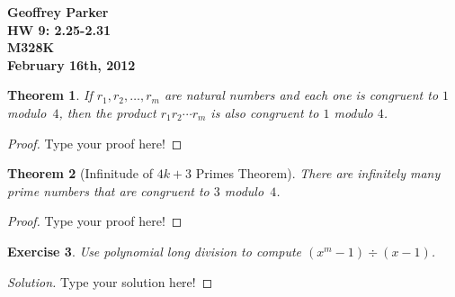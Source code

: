 \documentclass[12pt,leqno]{article}
\numberwithin{equation}{section}
\newtheorem{thm}{Theorem}[section]
\newtheorem{exer}[thm]{Exercise}
\theoremstyle{definition}
\begin{document}
\thispagestyle{plain}
\begin{flushright}
\large{\textbf{Geoffrey Parker \\
HW 9: 2.25-2.31\\
M328K \\
February 16th, 2012 \\}}
\end{flushright}

\markboth{}{} \setcounter{section}{0} \baselineskip=18pt

\setcounter{tocdepth}{4}



\setcounter{section}{2}

\setcounter{thm}{36}


\begin{thm}
If $r_1, r_2, \hdots, r_m$ are natural numbers and each one is
congruent to $1$ modulo~$4$, then the product $r_1r_2 \cdots r_m$ is
also congruent to $1$ modulo $4$.
\end{thm}

\begin{proof}[Proof]
Type your proof here!
\end{proof}



\begin{thm}[Infinitude of $4k + 3$ Primes Theorem]
There are infinitely many prime numbers that are congruent to $3$
modulo~$4$.
\end{thm}

\begin{proof}[Proof]
Type your proof here!
\end{proof}


\setcounter{thm}{40}


\begin{exer}
Use  polynomial long division to compute $(x^m-1) \div (x-1)$.
\end{exer}

\begin{proof}[Solution]
Type your solution here!
\end{proof}
\end{document}
